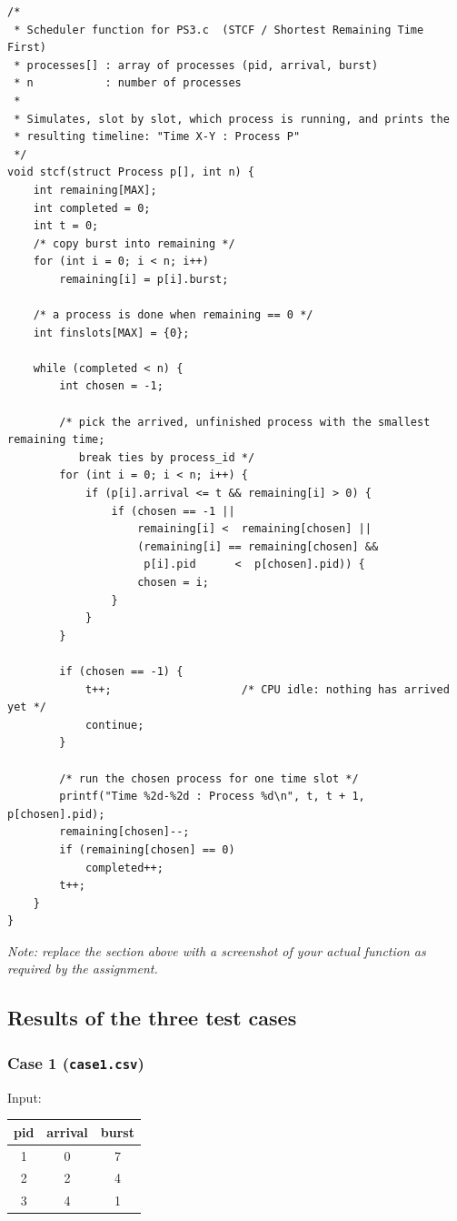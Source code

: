 \documentclass[11pt,a4paper]{article}
\begin{document}
\begin{lstlisting}[style=cstyle]
/*
 * Scheduler function for PS3.c  (STCF / Shortest Remaining Time First)
 * processes[] : array of processes (pid, arrival, burst)
 * n           : number of processes
 *
 * Simulates, slot by slot, which process is running, and prints the
 * resulting timeline: "Time X-Y : Process P"
 */
void stcf(struct Process p[], int n) {
    int remaining[MAX];
    int completed = 0;
    int t = 0;
    /* copy burst into remaining */
    for (int i = 0; i < n; i++)
        remaining[i] = p[i].burst;

    /* a process is done when remaining == 0 */
    int finslots[MAX] = {0};

    while (completed < n) {
        int chosen = -1;

        /* pick the arrived, unfinished process with the smallest remaining time;
           break ties by process_id */
        for (int i = 0; i < n; i++) {
            if (p[i].arrival <= t && remaining[i] > 0) {
                if (chosen == -1 ||
                    remaining[i] <  remaining[chosen] ||
                    (remaining[i] == remaining[chosen] &&
                     p[i].pid      <  p[chosen].pid)) {
                    chosen = i;
                }
            }
        }

        if (chosen == -1) {
            t++;                    /* CPU idle: nothing has arrived yet */
            continue;
        }

        /* run the chosen process for one time slot */
        printf("Time %2d-%2d : Process %d\n", t, t + 1, p[chosen].pid);
        remaining[chosen]--;
        if (remaining[chosen] == 0)
            completed++;
        t++;
    }
}
\end{lstlisting}

\textit{Note: replace the section above with a screenshot of your actual function as required
by the assignment.}

\subsection{Results of the three test cases}

\subsubsection{Case 1 (\texttt{case1.csv})}
Input:
\begin{center}
\begin{tabular}{ccc}
\toprule
pid & arrival & burst \\
\midrule
1 & 0 & 7 \\
2 & 2 & 4 \\
3 & 4 & 1 \\
\bottomrule
\end{tabular}
\end{center}
\end{document}
